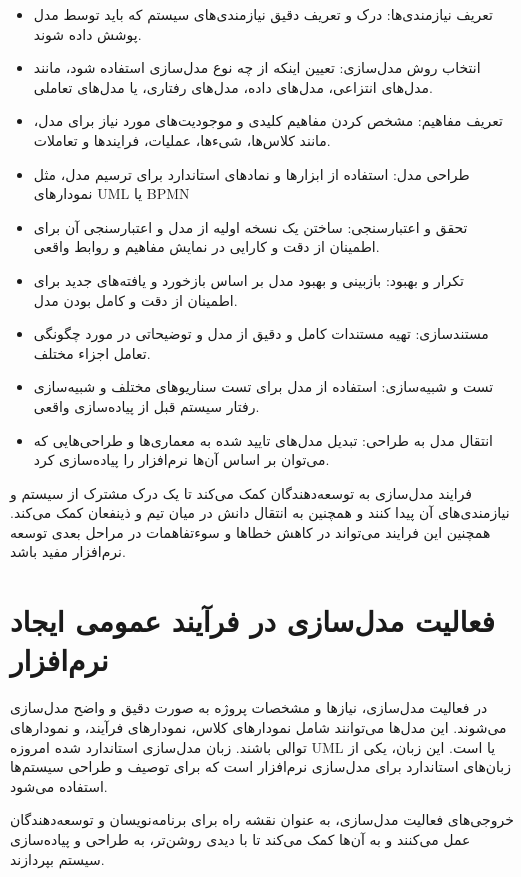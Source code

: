 \begin{itemize}
	\item تعریف نیازمندی‌ها: درک و تعریف دقیق نیازمندی‌های سیستم که باید توسط مدل پوشش داده شوند.
	\item انتخاب روش مدل‌سازی: تعیین اینکه از چه نوع مدل‌سازی استفاده شود، مانند مدل‌های انتزاعی، مدل‌های داده، مدل‌های رفتاری، یا مدل‌های تعاملی.
	\item تعریف مفاهیم: مشخص کردن مفاهیم کلیدی و موجودیت‌های مورد نیاز برای مدل، مانند کلاس‌ها، شی‌ءها، عملیات، فرایندها و تعاملات.
	\item طراحی مدل: استفاده از ابزارها و نمادهای استاندارد برای ترسیم مدل، مثل نمودارهای UML یا BPMN
	\item تحقق و اعتبارسنجی: ساختن یک نسخه اولیه از مدل و اعتبارسنجی آن برای اطمینان از دقت و کارایی در نمایش مفاهیم و روابط واقعی.
	\item تکرار و بهبود: بازبینی و بهبود مدل بر اساس بازخورد و یافته‌های جدید برای اطمینان از دقت و کامل بودن مدل.
	\item مستندسازی: تهیه مستندات کامل و دقیق از مدل و توضیحاتی در مورد چگونگی تعامل اجزاء مختلف.
	\item تست و شبیه‌سازی: استفاده از مدل برای تست سناریوهای مختلف و شبیه‌سازی رفتار سیستم قبل از پیاده‌سازی واقعی.
	\item انتقال مدل به طراحی: تبدیل مدل‌های تایید شده به معماری‌ها و طراحی‌هایی که می‌توان بر اساس آن‌ها نرم‌افزار را پیاده‌سازی کرد.
\end{itemize}

فرایند مدل‌سازی به توسعه‌دهندگان کمک می‌کند تا یک درک مشترک از سیستم و نیازمندی‌های آن پیدا کنند و همچنین به انتقال دانش در میان تیم و ذینفعان کمک می‌کند. همچنین این فرایند می‌تواند در کاهش خطاها و سوءتفاهمات در مراحل بعدی توسعه نرم‌افزار مفید باشد.


\section*{فعالیت مدل‌سازی در فرآیند عمومی ایجاد نرم‌افزار}

در فعالیت مدل‌سازی، نیازها و مشخصات پروژه به صورت دقیق و واضح مدل‌سازی می‌شوند. این مدل‌ها می‌توانند شامل نمودارهای کلاس، نمودارهای فرآیند، و نمودارهای توالی باشند. زبان مدل‌سازی استاندارد شده امروزه UML یا
است. این زبان، یکی از زبان‌های استاندارد برای مدل‌سازی نرم‌افزار است که برای توصیف و طراحی سیستم‌ها استفاده می‌شود.

خروجی‌های فعالیت مدل‌سازی، به عنوان نقشه راه برای برنامه‌نویسان و توسعه‌دهندگان عمل می‌کنند و به آن‌ها کمک می‌کند تا با دیدی روشن‌تر، به طراحی و پیاده‌سازی سیستم بپردازند.

